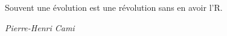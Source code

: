 \documentclass[french, a4paper, 11pt, twoside, pdftex]{StyleThese}
\begin{document}
\makeflyleaf
\cleardoublepage

\dominitoc


 \cleardoublepage
\vspace*{5cm}
\epigraph{{\large Souvent une évolution est une révolution sans en avoir l'R.}}
{{\smallbreak\large \textit{Pierre-Henri Cami}}}

\cleardoublepage



\tableofcontents
\end{document}
